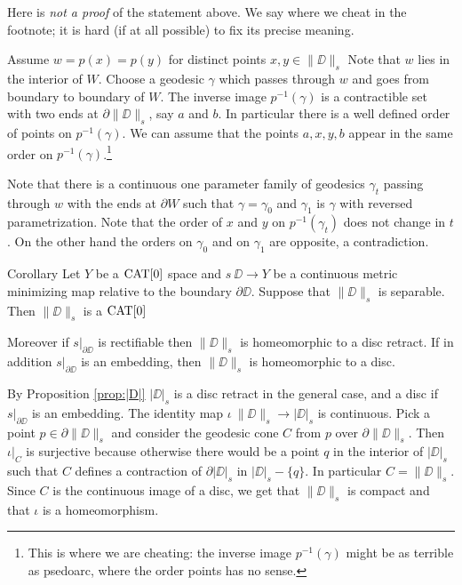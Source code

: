 \documentclass{article}
\begin{document}
Here is \emph{not a proof} of the statement above.
We say where we cheat in the footnote; 
it is hard (if at all possible) to fix its precise meaning.

 Assume  $w=p(x)=p(y)$ for distinct points $x,y\in\|\DD\|_s$
Note that  $w$ lies in the interior of $W$.
Choose a geodesic $\gamma$ which passes through $w$ and goes 
from boundary to boundary of $W$.
The inverse image $p^{-1}(\gamma)$ is a contractible set with two ends at $\partial\|\DD\|_s$, say $a$ and $b$.
In particular there is a well defined order of  points on $p^{-1}(\gamma)$.
We can assume that the points $a,x,y,b$ appear in the same order on $p^{-1}(\gamma)$.\footnote{This is where we are cheating: the inverse image $p^{-1}(\gamma)$ might be as terrible as psedoarc, where the order points has no sense.}

Note that there is a continuous one parameter family of geodesics $\gamma_t$ passing through $w$ with the ends at $\partial W$
such that $\gamma=\gamma_0$ and $\gamma_1$ is $\gamma$ with reversed parametrization.
Note that the order of $x$ and $y$ on $p^{-1}(\gamma_t)$ does not change in $t$.
On the other hand the orders on $\gamma_0$ and on $\gamma_1$ are opposite, a contradiction.\qeds 

\begin{thm}{Corollary}\label{cor:main}
Let $Y$ be a $\mathop{\rm CAT}\nolimits[0]$ space 
and $s\:\DD\to Y$ be a continuous metric minimizing map relative to the boundary $\partial\DD$.
Suppose that $\|\DD\|_s$  is separable.
Then $\|\DD\|_s$ is a $\mathop{\rm CAT}\nolimits[0]$

Moreover if $s|_{\partial\DD}$ is rectifiable then $\|\DD\|_s$ is homeomorphic to a  disc retract. 
If in addition  $s|_{\partial\DD}$ is an embedding,
then $\|\DD\|_s$ is homeomorphic to a disc.
\end{thm}

By Proposition \ref{prop:|D|} $|\DD|_s$ is a disc retract in the general case, and a disc if $s|_{\partial\DD}$ is an embedding.
The identity map $\iota\:\|\DD\|_s\to |\DD|_s$ is continuous.
Pick a point $p\in\partial\|\DD\|_s$ and consider the geodesic 
cone $C$ from $p$ over $\partial\|\DD\|_s$.
Then $\iota|_C$ is surjective because otherwise there would be a point $q$ in the 
interior of $|\DD|_s$ such that $C$ defines a contraction of $\partial|\DD|_s$ in $|\DD|_s-\{q\}$. 
In particular $C=\|\DD\|_s$.
Since $C$ is the continuous image of a disc, we get that $\|\DD\|_s$ is compact and that $\iota$ is a homeomorphism.
\qeds
\end{document}
